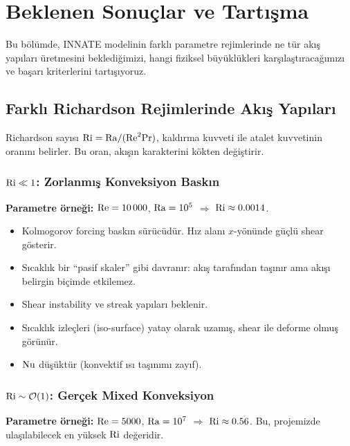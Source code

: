 \chapter{Beklenen Sonuçlar ve Tartışma}
\label{ch:beklenen}

Bu bölümde, INNATE modelinin farklı parametre rejimlerinde ne tür akış yapıları üretmesini beklediğimizi, hangi fiziksel büyüklükleri karşılaştıracağımızı ve başarı kriterlerini tartışıyoruz.


\section{Farklı Richardson Rejimlerinde Akış Yapıları}
\label{sec:ri_regimes}

Richardson sayısı $\mathrm{Ri} = \mathrm{Ra}/(\mathrm{Re}^2 \mathrm{Pr})$, kaldırma kuvveti ile atalet kuvvetinin oranını belirler. Bu oran, akışın karakterini kökten değiştirir.

\subsection{$\mathrm{Ri} \ll 1$: Zorlanmış Konveksiyon Baskın}

\textbf{Parametre örneği:} $\mathrm{Re} = 10\,000$, $\mathrm{Ra} = 10^5$ $\Rightarrow$ $\mathrm{Ri} \approx 0.0014$.

\begin{itemize}
    \item Kolmogorov forcing baskın sürücüdür. Hız alanı $x$-yönünde güçlü shear gösterir.
    \item Sıcaklık bir ``pasif skaler'' gibi davranır: akış tarafından taşınır ama akışı belirgin biçimde etkilemez.
    \item Shear instability ve streak yapıları beklenir.
    \item Sıcaklık izleçleri (iso-surface) yatay olarak uzamış, shear ile deforme olmuş görünür.
    \item $\mathrm{Nu}$ düşüktür (konvektif ısı taşınımı zayıf).
\end{itemize}

\subsection{$\mathrm{Ri} \sim \mathcal{O}(1)$: Gerçek Mixed Konveksiyon}

\textbf{Parametre örneği:} $\mathrm{Re} = 5000$, $\mathrm{Ra} = 10^7$ $\Rightarrow$ $\mathrm{Ri} \approx 0.56$. Bu, projemizde ulaşılabilecek en yüksek $\mathrm{Ri}$ değeridir.

